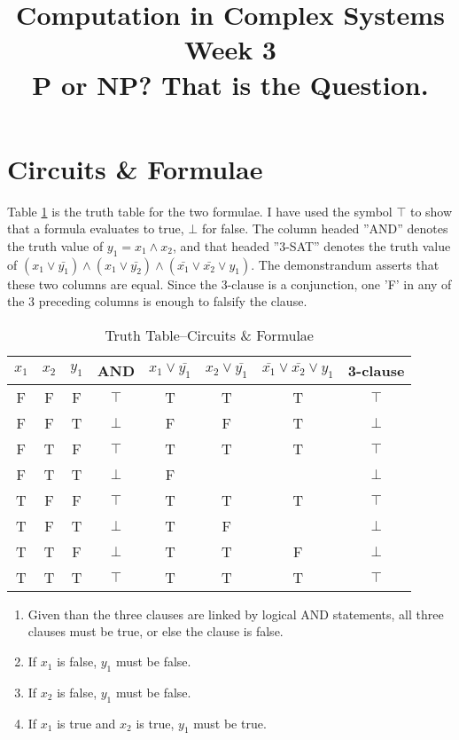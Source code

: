 \documentclass[]{article}
\title{Computation in Complex Systems\\
	Week 3\\
	P or NP? That is the Question.
	}
\begin{document}
\maketitle

\section{Circuits \& Formulae}

Table \ref{table:truth} is the truth table for the two formulae. I have used the symbol $\top$ to show that a formula evaluates to true, $\bot$ for false. The column headed ''AND'' denotes the truth value of $y_1 = x_1 \land x_2$, and that headed ''3-SAT'' denotes the truth value of $ (x_1\lor \bar{y_1}) \land (x_1\lor \bar{y_2}) \land (\bar{x_1} \lor \bar{x_2} \lor y_1)$. The demonstrandum asserts that these two columns are equal. Since the 3-clause is a conjunction, one 'F' in any of the 3 preceding columns is enough to falsify the clause.

\begin{table}[H]
	\caption{Truth Table--Circuits \& Formulae}\label{table:truth}
	\begin{center}
		\begin{tabular}{|c|c|c||c|c|c|c||c|}\hline
			$x_1$&$x_2$&$y_1$&AND&$x_1 \lor \bar{y_1}$&$x_2 \lor \bar{y_1}$&$\bar{x_1}\lor\bar{x_2}\lor y_1$&3-clause\\ \hline
			F&F&F&$\top$&T&T&T&$\top$\\ \hline
			F&F&T&$\bot$&F&F&T&$\bot$\\ \hline
			F&T&F&$\top$&T&T&T&$\top$\\ \hline
			F&T&T&$\bot$&F&&&$\bot$\\ \hline
			T&F&F&$\top$&T&T&T&$\top$\\ \hline
			T&F&T&$\bot$&T&F&&$\bot$\\ \hline
			T&T&F&$\bot$&T&T&F&$\bot$\\ \hline
			T&T&T&$\top$&T&T&T&$\top$\\ \hline
		\end{tabular}
	\end{center}
\end{table}

\begin{enumerate}
	\item Given than the three clauses are linked by logical AND statements, all three clauses must be true, or else the clause is false.
	
	\item If $x_1$ is false, $y_1$ must be false.
	
	\item If $x_2$ is false, $y_1$ must be false.
	
	\item If $x_1$ is true and $x_2$ is true, $y_1$ must be true.
\end{enumerate}
\end{document}

